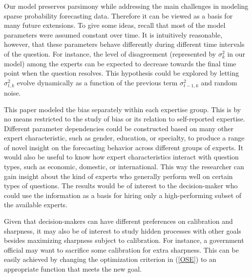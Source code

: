 \documentclass[aoas, preprint]{imsart}
\numberwithin{equation}{section}
\theoremstyle{plain}
\begin{document}
Our model preserves parsimony while addressing the main challenges in modeling sparse probability forecasting data. Therefore it can be viewed as a basis for many future extensions. To give some ideas, recall that most of the model parameters were assumed constant over time. It is intuitively reasonable, however, that these parameters behave differently during different time intervals of the question.  For instance, the level of disagreement (represented by $\sigma^2_k$ in our model) among the experts can be expected to decrease towards the final time point when the question  resolves. This hypothesis could be explored by letting $\sigma^2_{t,k}$ evolve dynamically as a function of the previous term $\sigma^2_{t-1,k}$ and random noise. 

%
This paper modeled the bias separately within each expertise group. This is by no means restricted to the study of bias or its relation to self-reported expertise. Different parameter dependencies could be constructed based on many other expert characteristic, such as gender, education, or specialty, to produce a range of novel insight on the forecasting behavior across different groups of experts. It would also be useful to know how expert characteristics interact with question types, such as economic, domestic, or international. This way the researcher can gain insight about the kind of experts who generally perform well on certain types of questions. The results would be of interest to the decision-maker who could use the information as a basis for hiring only a high-performing subset of the available experts. 
 
 
Given that decision-makers can have different preferences on calibration and sharpness, it may also be of interest to study hidden processes with other goals besides maximizing sharpness subject to calibration. For instance, a government official may want to sacrifice some calibration for extra sharpness. This can be easily achieved by changing the optimization criterion in (\ref{OSE}) to an appropriate function that meets the new goal. 
 
\end{document}
